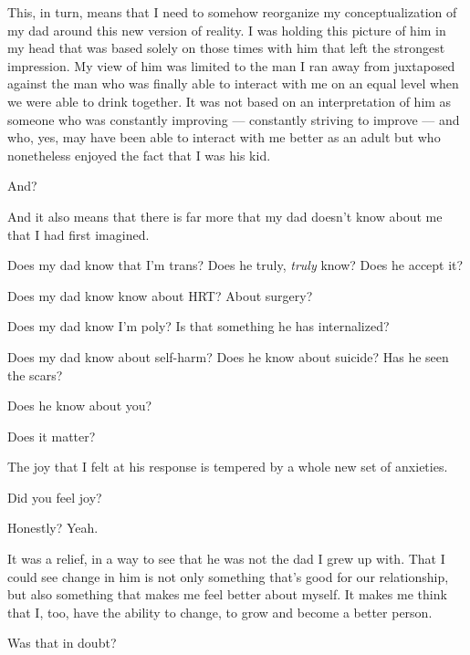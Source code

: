 This, in turn, means that I need to somehow reorganize my conceptualization of my dad around this new version of reality. I was holding this picture of him in my head that was based solely on those times with him that left the strongest impression. My view of him was limited to the man I ran away from juxtaposed against the man who was finally able to interact with me on an equal level when we were able to drink together. It was not based on an interpretation of him as someone who was constantly improving --- constantly striving to improve --- and who, yes, may have been able to interact with me better as an adult but who nonetheless enjoyed the fact that I was his kid.

\begin{ally}
  And?
\end{ally}

And it also means that there is far more that my dad doesn't know about me that I had first imagined.

\newpage

Does my dad know that I'm trans? Does he truly, \emph{truly} know? Does he accept it?

Does my dad know know about HRT? About surgery?

Does my dad know I'm poly? Is that something he has internalized?

Does my dad know about self-harm? Does he know about suicide? Has he seen the scars?

Does he know about you?

\begin{ally}
  Does it matter?
\end{ally}

The joy that I felt at his response is tempered by a whole new set of anxieties.

\begin{ally}
  Did you feel joy?
\end{ally}

Honestly? Yeah.

It was a relief, in a way to see that he was not the dad I grew up with. That I could see change in him is not only something that's good for our relationship, but also something that makes me feel better about myself. It makes me think that I, too, have the ability to change, to grow and become a better person.

\begin{ally}
  Was that in doubt?
\end{ally}

